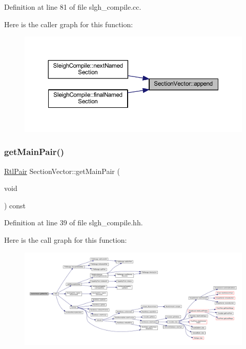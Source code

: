 Definition at line 81 of file slgh\+\_\+compile.\+cc.

Here is the caller graph for this function\+:
\nopagebreak
\begin{figure}[H]
\begin{center}
\leavevmode
\includegraphics[width=350pt]{class_section_vector_a76c623f1984fcb88dc141d85066a97c6_icgraph}
\end{center}
\end{figure}
\mbox{\label{class_section_vector_af36cf99932d7673a42e2fef0d1587f47}} 
\subsubsection{\texorpdfstring{getMainPair()}{getMainPair()}}
{\footnotesize\ttfamily \mbox{\hyperlink{struct_rtl_pair}{Rtl\+Pair}} Section\+Vector\+::get\+Main\+Pair (\begin{DoxyParamCaption}\item[{void}]{ }\end{DoxyParamCaption}) const\hspace{0.3cm}{\ttfamily [inline]}}



Definition at line 39 of file slgh\+\_\+compile.\+hh.

Here is the call graph for this function\+:
\nopagebreak
\begin{figure}[H]
\begin{center}
\leavevmode
\includegraphics[width=350pt]{class_section_vector_af36cf99932d7673a42e2fef0d1587f47_cgraph}
\end{center}
\end{figure}
\mbox{\label{class_section_vector_a997580aa88cc1f26aabc9317ccd3d035}} 
